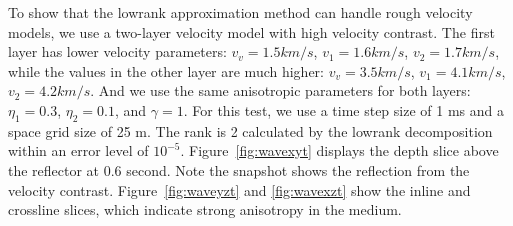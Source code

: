 


To show that the lowrank approximation method can handle rough velocity
models, we use a two-layer velocity model with high velocity contrast.
The first layer has lower velocity parameters: $v_v=1.5 km/s$, $v_1=1.6 km/s$, $v_2=1.7 km/s$, 
while the values in the other layer are much higher: $v_v=3.5 km/s$, $v_1=4.1 km/s$, $v_2=4.2 km/s$. 
And we use the same anisotropic parameters for both layers: $\eta_1=0.3$, $\eta_2=0.1$, and $\gamma=1$.
For this test, we use a time step size of 1 ms and a space grid size of 25 m.
The rank is 2 calculated by the lowrank decomposition within an error level of $10^{-5}$.
Figure~\ref{fig:wavexyt} displays the depth slice above the reflector at 0.6 second. 
Note the snapshot shows the reflection from the velocity contrast. 
Figure~\ref{fig:waveyzt} and \ref{fig:wavexzt} show the inline and crossline slices, which indicate strong anisotropy in the medium.


